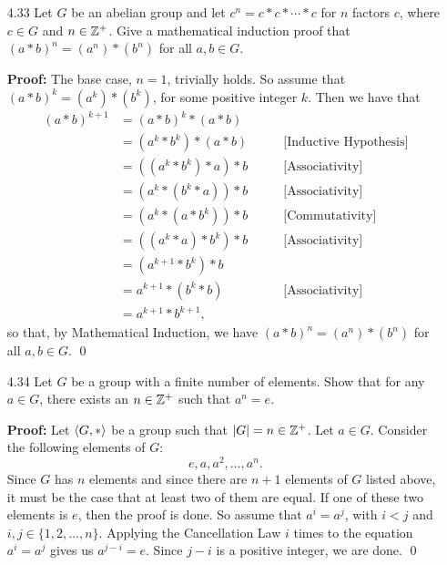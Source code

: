 \begin{enumerate}
      \textbf{Proof:} Let $\cyc{G, *}$ be a group with identity $e$ such
      that $x * x = e$ for all $x \in G$, or equivalently, $x' = x$ for all
      $x \in G$. Let $a, b \in G$. Then $(a * b)' = a * b$. But we know from the
      discussion in the textbook that $(a * b)' = b' * a'$. Thus we have that
      $a * b = b' * a' = b * a$, so that $\cyc{G, *}$ is abelian. \qed
   \item[4.33] Let $G$ be an abelian group and let $c^n = c * c * \cdots * c$
               for $n$ factors $c$, where $c \in G$ and $n \in \mathbb{Z}^+$. Give a 
               mathematical induction proof that $(a * b)^n = (a^n) * (b^n)$ for
               all $a, b \in G$.

      \textbf{Proof:} The base case, $n = 1$, trivially holds. So assume that
      $(a * b)^k = (a^k) * (b^k)$, for some positive integer $k$. Then we have
      that
      \begin{align*}
         (a * b)^{k+1} &= (a * b)^k * (a * b) \\
            &= (a^k * b^k) * (a * b) \qquad &\text{[Inductive Hypothesis]} \\
            &= ((a^k * b^k) * a) * b \qquad &\text{[Associativity]} \\
            &= (a^k * (b^k * a)) * b \qquad &\text{[Associativity]} \\
            &= (a^k * (a * b^k)) * b \qquad &\text{[Commutativity]} \\
            &= ((a^k * a) * b^k) * b \qquad &\text{[Associativity]} \\
            &= (a^{k+1} * b^k) * b   \\
            &= a^{k+1} * (b^k * b) \qquad &\text{[Associativity]} \\
            &= a^{k+1} * b^{k+1}, 
      \end{align*}
      so that, by Mathematical Induction, we have $(a * b)^n = (a^n) * (b^n)$ 
      for all $a, b \in G$. \qed
   \item[4.34] Let $G$ be a group with a finite number of elements. Show that
               for any $a \in G$, there exists an $n \in \mathbb{Z}^+$ such that
               $a^ n = e$.
   
      \textbf{Proof:} Let $\cyc{G, *}$ be a group such that $|G| = n \in \mathbb{Z}^+$.
      Let $a \in G$. Consider the following elements of $G$:
      $$e, a, a^2, \ldots, a^n.$$
      Since $G$ has $n$ elements and since there are $n + 1$ elements of $G$ 
      listed above, it must be the case that at least two of them are equal. If
      one of these two elements is $e$, then the proof is done. So assume that
      $a^i = a^j$, with $i < j$ and $i, j \in \{1, 2, \ldots, n\}$. Applying the
      Cancellation Law $i$ times to the equation $a^i = a^j$ gives us
      $a^{j - i} = e$. Since $j - i$ is a positive integer, we are done. \qed
      

\end{enumerate}
